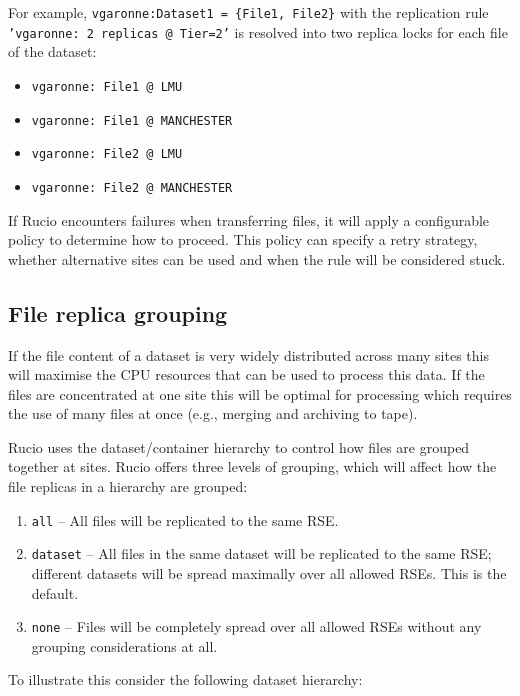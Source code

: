 \documentclass{atlasnote}
\begin{document}
For example, \texttt{vgaronne:Dataset1 = \{File1, File2\}} with the replication rule \texttt{'vgaronne: 2 replicas @ Tier=2'} is resolved into two replica locks for each file of the dataset:

\begin{itemize}
\item[] \texttt{vgaronne: File1 @ LMU}
\item[] \texttt{vgaronne: File1 @ MANCHESTER}
\item[] \texttt{vgaronne: File2 @ LMU}
\item[] \texttt{vgaronne: File2 @ MANCHESTER}
\end{itemize}

If Rucio encounters failures when transferring files, it will apply a configurable policy to determine how to proceed. This policy can specify a retry strategy, whether alternative sites can be used and when the rule will be considered stuck.

\subsection{File replica grouping}
\label{sec:file-replica-grouping}

If the file content of a dataset is very widely distributed across many sites this will maximise the CPU resources that can be used to process this data. If the files are concentrated at one site this will be optimal for processing which requires the use of many files at once (e.g., merging and archiving to tape).

Rucio uses the dataset/container hierarchy to control how files are grouped together at sites. Rucio offers three levels of grouping, which will affect how the file replicas in a hierarchy are grouped:
\begin{enumerate}
\item[] \texttt{all} -- All files will be replicated to the same RSE.
\item[] \texttt{dataset} -- All files in the same dataset will be replicated to the same RSE; different datasets will be spread maximally over all allowed RSEs. This is the default.
\item[] \texttt{none} -- Files will be completely spread over all allowed RSEs without any grouping considerations at all.
\end{enumerate}

To illustrate this consider the following dataset hierarchy:
\end{document}
